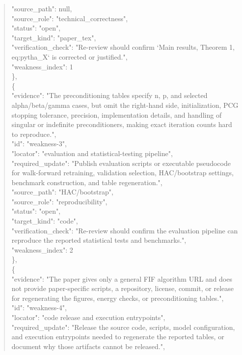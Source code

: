 \documentclass[11pt]{article}
\begin{document}
\begin{quote}
      "source\_path": null,\\
      "source\_role": "technical\_correctness",\\
      "status": "open",\\
      "target\_kind": "paper\_tex",\\
      "verification\_check": "Re-review should confirm `Main results, Theorem 1, eq:pytha\_X` is corrected or justified.",\\
      "weakness\_index": 1\\
    \},\\
    \{\\
      "evidence": "The preconditioning tables specify n, p, and selected alpha/beta/gamma cases, but omit the right-hand side, initialization, PCG stopping tolerance, precision, implementation details, and handling of singular or indefinite preconditioners, making exact iteration counts hard to reproduce.",\\
      "id": "weakness-3",\\
      "locator": "evaluation and statistical-testing pipeline",\\
      "required\_update": "Publish evaluation scripts or executable pseudocode for walk-forward retraining, validation selection, HAC/bootstrap settings, benchmark construction, and table regeneration.",\\
      "source\_path": "HAC/bootstrap",\\
      "source\_role": "reproducibility",\\
      "status": "open",\\
      "target\_kind": "code",\\
      "verification\_check": "Re-review should confirm the evaluation pipeline can reproduce the reported statistical tests and benchmarks.",\\
      "weakness\_index": 2\\
    \},\\
    \{\\
      "evidence": "The paper gives only a general FIF algorithm URL and does not provide paper-specific scripts, a repository, license, commit, or release for regenerating the figures, energy checks, or preconditioning tables.",\\
      "id": "weakness-4",\\
      "locator": "code release and execution entrypoints",\\
      "required\_update": "Release the source code, scripts, model configuration, and execution entrypoints needed to regenerate the reported tables, or document why those artifacts cannot be released.",\\

\end{quote}
\end{document}

